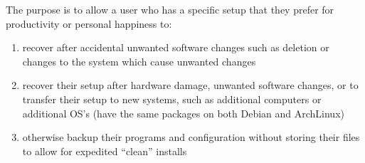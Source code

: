 \documentclass[12pt]{article}
\begin{document}
            The purpose is to allow a user who has a specific setup that they prefer for productivity or personal happiness to:
            \begin{enumerate}
                \item recover after accidental unwanted software changes such as deletion or changes to the system which cause unwanted changes
                \item recover their setup after hardware damage, unwanted software changes, or to transfer their setup to new systems, such as additional computers or additional OS's (have the same packages on both Debian and ArchLinux)
                \item otherwise backup their programs and configuration without storing their files to allow for expedited ``clean'' installs
            \end{enumerate}


\end{document}
